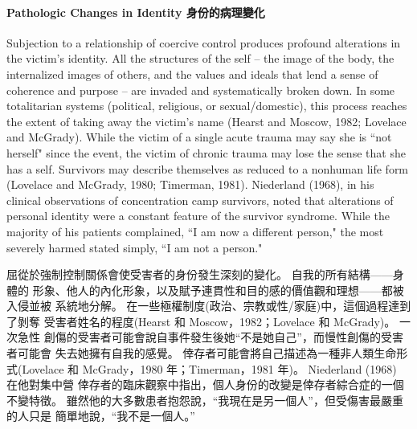 \documentclass[12pt]{article}
\begin{document}
\paragraph{Pathologic Changes in Identity 身份的病理變化}
    Subjection to a relationship of coercive control produces profound
    alterations in the victim's identity. All the structures of the self -- the
    image of the body, the internalized images of others, and the values and
    ideals that lend a sense of coherence and purpose -- are invaded and
    systematically broken down. In some totalitarian systems (political,
    religious, or sexual/domestic), this process reaches the extent of taking
    away the victim's name (Hearst and Moscow, 1982; Lovelace and McGrady).
    While the victim of a single acute trauma may say she is ``not herself"
    since the event, the victim of chronic trauma may lose the sense that she
    has a self. Survivors may describe themselves as reduced to a nonhuman life
    form (Lovelace and McGrady, 1980; Timerman, 1981). Niederland (1968), in
    his clinical observations of concentration camp survivors, noted that
    alterations of personal identity were a constant feature of the survivor
    syndrome. While the majority of his patients complained, ``I am now a
    different person," the most severely harmed stated simply, ``I am not a
    person."

    屈從於強制控制關係會使受害者的身份發生深刻的變化。 自我的所有結構——身體的
    形象、他人的內化形象，以及賦予連貫性和目的感的價值觀和理想——都被入侵並被
    系統地分解。 在一些極權制度(政治、宗教或性/家庭)中，這個過程達到了剝奪
    受害者姓名的程度(Hearst 和 Moscow，1982；Lovelace 和 McGrady)。 一次急性
    創傷的受害者可能會說自事件發生後她“不是她自己”，而慢性創傷的受害者可能會
    失去她擁有自我的感覺。 倖存者可能會將自己描述為一種非人類生命形式(Lovelace
    和 McGrady，1980 年；Timerman，1981 年)。 Niederland (1968) 在他對集中營
    倖存者的臨床觀察中指出，個人身份的改變是倖存者綜合症的一個不變特徵。 
    雖然他的大多數患者抱怨說，“我現在是另一個人”，但受傷害最嚴重的人只是
    簡單地說，“我不是一個人。”
\end{document}
